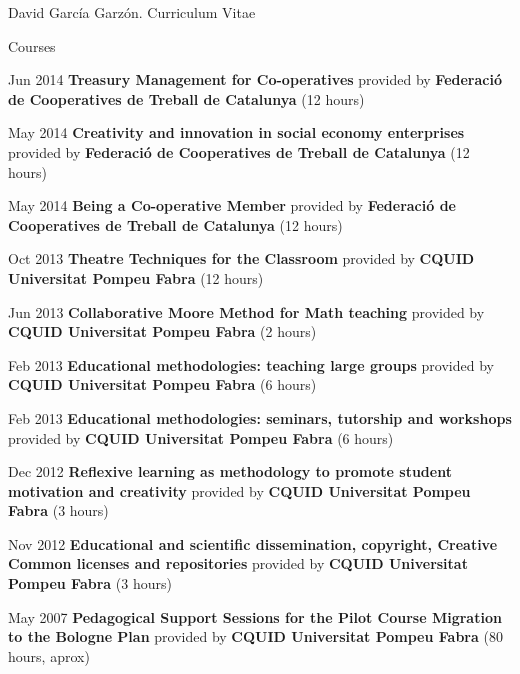 \documentclass{article}
\begin{document}
\begin{cv}{David García Garzón. Curriculum Vitae}
\begin{cvlist}{Courses}
\item[Jun 2014]
	{\bf Treasury Management for Co-operatives } provided by {\bf Federació de Cooperatives de Treball de Catalunya} (12 hours)

\item[May 2014]
	{\bf Creativity and innovation in social economy enterprises } provided by {\bf Federació de Cooperatives de Treball de Catalunya} (12 hours)

\item[May 2014]
	{\bf Being a Co-operative Member } provided by {\bf Federació de Cooperatives de Treball de Catalunya} (12 hours)

\item[Oct 2013]
	{\bf Theatre Techniques for the Classroom } provided by {\bf CQUID Universitat Pompeu Fabra} (12 hours)

\item[Jun 2013]
	{\bf Collaborative Moore Method for Math teaching } provided by {\bf CQUID Universitat Pompeu Fabra} (2 hours)

\item[Feb 2013]
	{\bf Educational methodologies: teaching large groups } provided by {\bf CQUID Universitat Pompeu Fabra} (6 hours)

\item[Feb 2013]
	{\bf Educational methodologies: seminars, tutorship and workshops } provided by {\bf CQUID Universitat Pompeu Fabra} (6 hours)

\item[Dec 2012]
	{\bf Reflexive learning as methodology to promote student motivation and creativity } provided by {\bf CQUID Universitat Pompeu Fabra} (3 hours)

\item[Nov 2012]
	{\bf Educational and scientific dissemination, copyright, Creative Common licenses and repositories } provided by {\bf CQUID Universitat Pompeu Fabra} (3 hours)

\item[May 2007]
	{\bf Pedagogical Support Sessions for the Pilot Course Migration to the Bologne Plan } provided by {\bf CQUID Universitat Pompeu Fabra} (80 hours, aprox)

\end{cvlist}


\end{cv}
\end{document}
